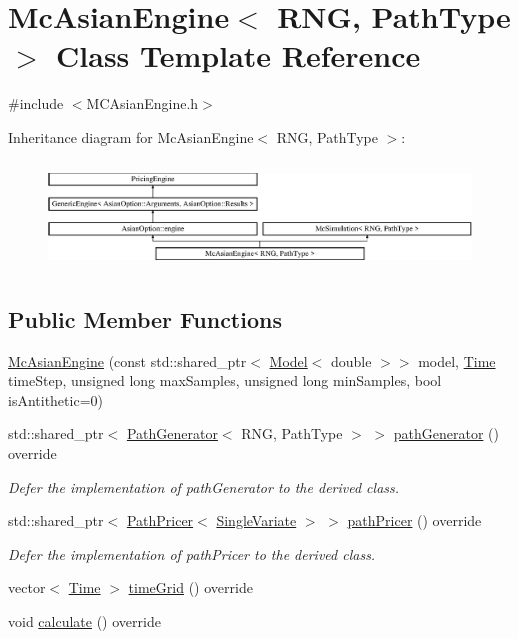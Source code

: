 \hypertarget{class_mc_asian_engine}{}\section{Mc\+Asian\+Engine$<$ R\+NG, Path\+Type $>$ Class Template Reference}
\label{class_mc_asian_engine}


{\ttfamily \#include $<$M\+C\+Asian\+Engine.\+h$>$}

Inheritance diagram for Mc\+Asian\+Engine$<$ R\+NG, Path\+Type $>$\+:\begin{figure}[H]
\begin{center}
\leavevmode
\includegraphics[height=2.894057cm]{class_mc_asian_engine}
\end{center}
\end{figure}
\subsection*{Public Member Functions}
\begin{DoxyCompactItemize}
\item 
\hyperlink{class_mc_asian_engine_a709959c19317f1dd319e043e409199fa}{Mc\+Asian\+Engine} (const std\+::shared\+\_\+ptr$<$ \hyperlink{class_model}{Model}$<$ double $>$$>$ model, \hyperlink{_name_def_8h_ac2d3e0ba793497bcca555c7c2cf64ff3}{Time} time\+Step, unsigned long max\+Samples, unsigned long min\+Samples, bool is\+Antithetic=0)
\item 
std\+::shared\+\_\+ptr$<$ \hyperlink{class_path_generator}{Path\+Generator}$<$ R\+NG, Path\+Type $>$ $>$ \hyperlink{class_mc_asian_engine_ae38592c71ae4d5d09c9eb13d7cc0c5ff}{path\+Generator} () override
\begin{DoxyCompactList}\small\item\em Defer the implementation of path\+Generator to the derived class. \end{DoxyCompactList}\item 
std\+::shared\+\_\+ptr$<$ \hyperlink{class_path_pricer}{Path\+Pricer}$<$ \hyperlink{struct_single_variate}{Single\+Variate} $>$ $>$ \hyperlink{class_mc_asian_engine_a5b7351c28b68878b7f6d130eef293d6c}{path\+Pricer} () override
\begin{DoxyCompactList}\small\item\em Defer the implementation of path\+Pricer to the derived class. \end{DoxyCompactList}\item 
vector$<$ \hyperlink{_name_def_8h_ac2d3e0ba793497bcca555c7c2cf64ff3}{Time} $>$ \hyperlink{class_mc_asian_engine_ad8d2c8721172ab1d7327db91a26c5052}{time\+Grid} () override
\item 
void \hyperlink{class_mc_asian_engine_ac16f4259846f55dc6c02d0b628f34e63}{calculate} () override
\end{DoxyCompactItemize}
